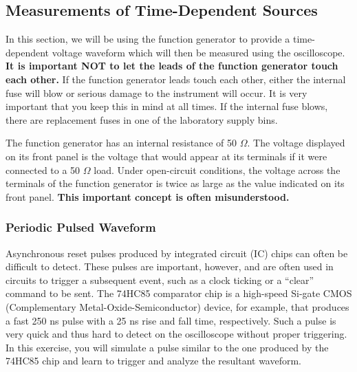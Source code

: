 \documentclass[12pt]{../manual}
\begin{document}
\subsection{Measurements of Time-Dependent Sources}
In this section, we will be using the function generator to provide a time-dependent voltage waveform which will then be measured using the oscilloscope. \textbf{It is important NOT to let the leads of the function generator touch each other.} If the function generator leads touch each other, either the internal fuse will blow or serious damage to the instrument will occur. It is very important that you keep this in mind at all times. If the internal fuse blows, there are replacement fuses in one of the laboratory supply bins.

The function generator has an internal resistance of 50 $\Omega$. The voltage displayed on its front panel is the voltage that would appear at its terminals if it were connected to a 50 $\Omega$ load. Under open-circuit conditions, the voltage across the terminals of the function generator is twice as large as the value indicated on its front panel. \textbf{This important concept is often misunderstood.}

\subsubsection{Periodic Pulsed Waveform}
Asynchronous reset pulses produced by integrated circuit (IC) chips can often be difficult to detect.  These pulses are important, however, and are often used in circuits to trigger a subsequent event, such as a clock ticking or a ``clear'' command to be sent.  The 74HC85 comparator chip is a high-speed Si-gate CMOS (Complementary Metal-Oxide-Semiconductor) device, for example, that produces a fast 250 ns pulse with a 25 ns rise and fall time, respectively.   Such a pulse is very quick and thus hard to detect on the oscilloscope without proper triggering.  In this exercise, you will simulate a pulse similar to the one produced by the 74HC85 chip and learn to trigger and analyze the resultant waveform.
\end{document}

